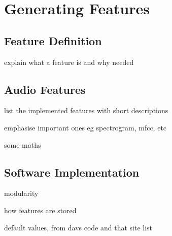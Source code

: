 \section{Generating Features}
\label{sec:pl-feats}
    \subsection{Feature Definition}
    \label{subsec:pl-feats-def}
        \begin{sitemize}
            \item{explain what a feature is and why needed}
        \end{sitemize}
        
    \subsection{Audio Features}
    \label{subsec:pl-feats-audio}
        \begin{sitemize}
            \item{list the implemented features with short descriptions}
            \item{emphasise important ones eg spectrogram, mfcc, etc}
            \item{some maths}
        \end{sitemize}
        
    \subsection{Software Implementation}
    \label{subsec:pl-feats-software}
        \begin{sitemize}
            \item{modularity}
            \item{how features are stored}
            \item{default values, from davs code and that site list}
        \end{sitemize}
        
  